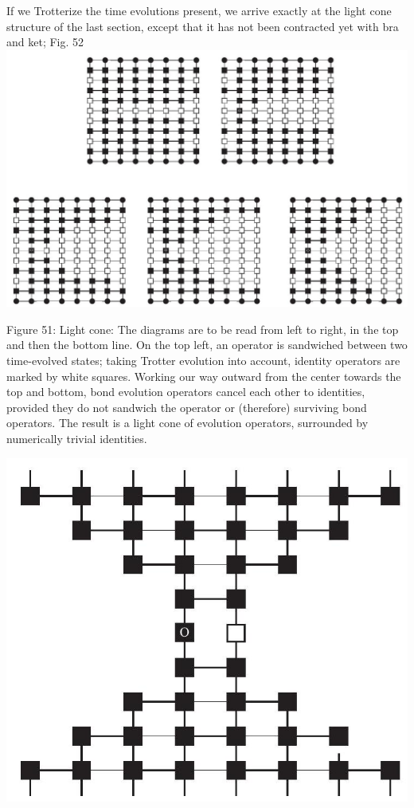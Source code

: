 \documentclass[12pt]{article}
\begin{document}
If we Trotterize the time evolutions present, we arrive exactly at the light cone structure of the last section, except that it has not been contracted yet with bra and ket; Fig. 52\\
\includegraphics[max width=\textwidth, center]{2024_05_04_afc4ad226da9ccfe0ac8g-090(1)}

Figure 51: Light cone: The diagrams are to be read from left to right, in the top and then the bottom line. On the top left, an operator is sandwiched between two time-evolved states; taking Trotter evolution into account, identity operators are marked by white squares. Working our way outward from the center towards the top and bottom, bond evolution operators cancel each other to identities, provided they do not sandwich the operator or (therefore) surviving bond operators. The result is a light cone of evolution operators, surrounded by numerically trivial identities.

\begin{center}
\includegraphics[max width=\textwidth]{2024_05_04_afc4ad226da9ccfe0ac8g-090}
\end{center}
\end{document}

